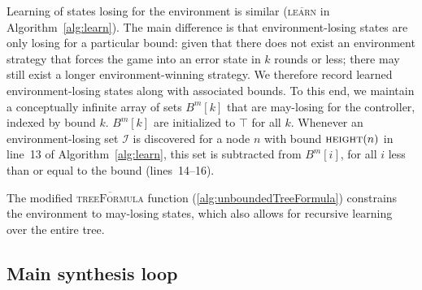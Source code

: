 \documentclass{llncs}
\newcommand{\textoverline}[1]{$\overline{\mbox{#1}}$}
\begin{document}
Learning of states losing for the environment is similar (\textsc{\textoverline{learn}} in Algorithm~\ref{alg:learn}). 
The main difference is that environment-losing states are only losing for a particular
bound: given that there does not exist an environment strategy that
forces the game into an error state in $k$ rounds or less; there may still exist a longer
environment-winning strategy.  We therefore record learned environment-losing states
along with associated bounds.  To this end, we maintain a conceptually infinite array of
sets $B^m[k]$ that are may-losing for the controller, indexed by bound $k$.  $B^m[k]$ 
are initialized to $\top$ for all $k$.  Whenever an environment-losing set $\mathcal{I}$
is discovered for a node $n$ with bound $\textsc{height}(n)$ in line~13 of Algorithm~\ref{alg:learn}, this set is subtracted from 
$B^m[i]$, for all $i$ less than or equal to the bound (lines~14--16).

The modified \textsc{\textoverline{treeFormula}} function (\ref{alg:unboundedTreeFormula})
constrains the environment to may-losing states, which also allows for
recursive learning over the entire tree.



\subsection{Main synthesis loop}
\end{document}
